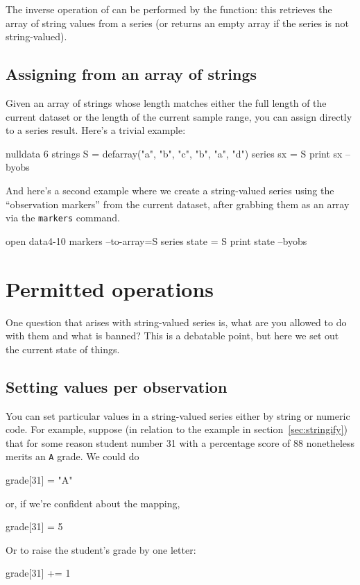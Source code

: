The inverse operation of  can be performed by the
 function: this retrieves the array of string values
from a series (or returns an empty array if the series is not
string-valued).

\subsection{Assigning from an array of strings}
\label{sec:array-assign}

Given an array of strings whose length matches either the full length
of the current dataset or the length of the current sample range, you
can assign directly to a series result. Here's a trivial example:
\begin{code}
nulldata 6
strings S = defarray("a", "b", "c", "b", "a", "d")
series sx = S
print sx --byobs
\end{code}
And here's a second example where we create a string-valued series
using the ``observation markers'' from the current dataset, after
grabbing them as an array via the \texttt{markers} command.
\begin{code}
open data4-10
markers --to-array=S
series state = S
print state --byobs
\end{code}

\section{Permitted operations}

One question that arises with string-valued series is, what are you
allowed to do with them and what is banned? This is a debatable point,
but here we set out the current state of things.

\subsection{Setting values per observation}

You can set particular values in a string-valued series either by
string or numeric code. For example, suppose (in relation to the
example in section~\ref{sec:stringify}) that for some reason student
number 31 with a percentage score of 88 nonetheless merits an
\texttt{A} grade. We could do
\begin{code}
grade[31] = "A"
\end{code}
or, if we're confident about the mapping,
\begin{code}
grade[31] = 5
\end{code}
Or to raise the student's grade by one letter:
\begin{code}
grade[31] += 1
\end{code}

